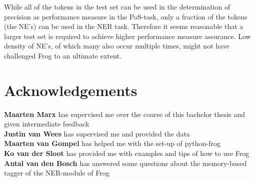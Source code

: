 While all of the tokens in the test set can be used in the determination of precision as performance measure in the PoS-task, only a fraction of the tokens (the NE's) can be used in the NER task. Therefore it seems reasonable that a larger test set is required to achieve higher performance measure assurance. Low density of NE's, of which many also occur multiple times, might not have challenged Frog to an ultimate extent. 

\section{Acknowledgements}
\textbf{Maarten Marx} has supervised me over the course of this bachelor thesis and given intermediate feedback\\
\textbf{Justin van Wees} has supervised me and provided the data\\
\textbf{Maarten van Gompel} has helped me with the set-up of python-frog\\
\textbf{Ko van der Sloot} has provided me with examples and tips of how to use Frog\\
\textbf{Antal van den Bosch} has answered some questions about the memory-based tagger of the NER-module of Frog\\

